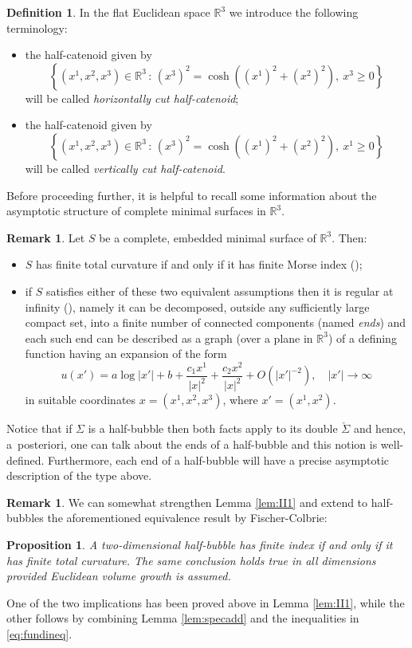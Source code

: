 \documentclass[10pt]{amsart}
\newcommand{\sep}{\,:\,}
\newtheorem{prop}[thm]{Proposition}
\theoremstyle{definition}
\newtheorem{definition}[thm]{Definition}
\newtheorem{rmk}[thm]{Remark}
\newcommand{\R}{\mathbb{R}}
\begin{document}
\begin{definition}\label{def:horcurvercut} In the flat Euclidean space $\R^3$ we introduce the following terminology:
\begin{itemize} \item{the half-catenoid given by
\[
\left\{(x^1, x^2, x^3)\in \R^3 \sep (x^3)^2=\cosh ((x^1)^2+(x^2)^2), \  x^3\geq 0 \right\}
\]
will be called \emph{horizontally cut half-catenoid};}
\item{the half-catenoid given by
\[
\left\{ (x^1, x^2, x^3)\in \R^3 \sep (x^3)^2=\cosh ((x^1)^2+(x^2)^2), \  x^1\geq 0 \right\}
\]
will be called \emph{vertically cut half-catenoid}.}
\end{itemize}
\end{definition}

Before proceeding further, it is helpful to recall some information about the asymptotic structure of complete minimal surfaces in $\R^3$.

\begin{rmk}\label{rem:reginf}
Let $S$ be a complete, embedded minimal surface of $\R^3$. Then:
\begin{itemize}
\item{$S$ has finite total curvature if and only if it has finite Morse index (\cf \cite{FC85});}
\item{if $S$ satisfies either of these two equivalent assumptions then it is regular at infinity (\cf \cite{Sc83}), namely it can be decomposed, outside any sufficiently large compact set, into a finite number of connected components (named \emph{ends}) and each such end can be described as a graph (over a plane in $\R^3$) of a defining function having an expansion of the form
\[
u(x')=a\log|x'|+b+\frac{c_1 x^1}{|x|^2}+\frac{c_2 x^2}{|x|^2}+O(|x'|^{-2}), \quad |x'|\to\infty
\]
in suitable coordinates $x=(x^1,x^2,x^3)$, where $x'=(x^1,x^2)$.
}
\end{itemize}
Notice that if $\Sigma$ is a half-bubble then both facts apply to its double $\check{\Sigma}$ and hence, a~post\-eriori, one can talk about the ends of a half-bubble and this notion is well-defined. Furthermore, each end of a half-bubble will have a precise asymptotic description of the type above.
\end{rmk}

\begin{rmk}
We can somewhat strengthen Lemma \ref{lem:II1} and extend to half-bubbles the aforementioned equivalence result by Fischer-Colbrie:
\end{rmk}
\begin{prop}\label{pro:equiv}
A two-dimensional half-bubble has finite index if and only if it has finite total curvature. The same conclusion holds true in all dimensions provided Euclidean volume growth is assumed.
\end{prop}
One of the two implications has been proved above in Lemma \ref{lem:II1}, while the other follows by combining Lemma \ref{lem:specadd} and the inequalities in \eqref{eq:fundineq}.
\end{document}
